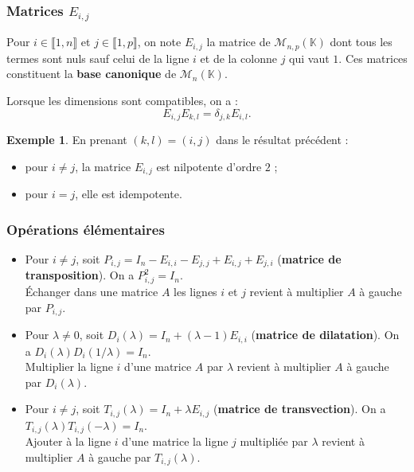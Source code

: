 \documentclass[french]{article}
\newcommand{\K}{\mathbb{K}}
\theoremstyle{plain}
\theoremstyle{definition}
\newtheorem*{ex}{Exemple}
\theoremstyle{remark}
\begin{document}
\subsubsection*{Matrices $E_{i,j}$}

Pour $i\in\llbracket1,n\rrbracket$ et $j\in\llbracket1,p\rrbracket$, on note $E_{i,j}$ la matrice de $\mathcal{M}_{n,p}(\K)$ dont tous les termes sont nuls sauf celui de la ligne $i$ et de la colonne $j$ qui vaut $1$. Ces matrices constituent la \textbf{base canonique} de $\mathcal{M}_n(\K)$.

\begin{prop}%
	Lorsque les dimensions sont compatibles, on a :
	$$E_{i,j}E_{k,l}=\delta_{j,k}E_{i,l}.$$
\end{prop}

\begin{ex}
	En prenant $(k,l)=(i,j)$ dans le résultat précédent :
	\begin{itemize}
		\item pour $i\ne j$, la matrice $E_{i,j}$ est nilpotente d'ordre $2$ ;
		\item pour $i=j$, elle est idempotente.
	\end{itemize}
\end{ex}

\subsubsection*{Opérations élémentaires}

\begin{itemize}
	\item Pour $i\ne j$, soit $P_{i,j}=I_n-E_{i,i}-E_{j,j}+E_{i,j}+E_{j,i}$ (\textbf{matrice de transposition}). On a $P_{i,j}^2=I_n$.\\
	Échanger dans une matrice $A$ les lignes $i$ et $j$ revient à multiplier $A$ à gauche par $P_{i,j}$.
	\item Pour $\lambda\ne0$, soit $D_i(\lambda)=I_n+(\lambda-1)E_{i,i}$ (\textbf{matrice de dilatation}). On a $D_i(\lambda)D_i(1/\lambda)=I_n$.\\
	Multiplier la ligne $i$ d'une matrice $A$ par $\lambda$ revient à multiplier $A$ à gauche par $D_i(\lambda)$.
	\item Pour $i\ne j$, soit $T_{i,j}(\lambda)=I_n+\lambda E_{i,j}$ (\textbf{matrice de transvection}).
	On a $T_{i,j}(\lambda)T_{i,j}(-\lambda)=I_n$.\\
	Ajouter à la ligne $i$ d'une matrice la ligne $j$ multipliée par $\lambda$ revient à multiplier $A$ à gauche par $T_{i,j}(\lambda)$.
\end{itemize}
\end{document}
